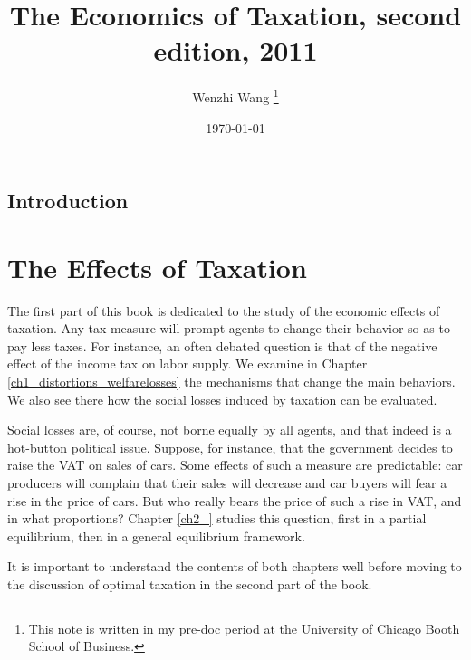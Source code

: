 \documentclass[12pt]{report}
\newcommand{\CiteReference}{../reference.bib}
\theoremstyle{definition}
\begin{document}
 


\title{\bf The Economics of Taxation, second edition, 2011} 
\author{Wenzhi Wang \thanks{This note is written in my pre-doc period at the University of Chicago Booth School of Business.} } 
\date{\today} 
\maketitle 

\tableofcontents

\chapter*{Introduction}

\part{The Effects of Taxation}

The first part of this book is dedicated to the study of the economic effects of taxation. Any tax measure will prompt agents to change their behavior so as to pay less taxes. For instance, an often debated question is that of the negative effect of the income tax on labor supply. We examine in Chapter \ref{ch1_distortions_welfarelosses} the mechanisms that change the main behaviors. We also see there how the social losses induced by taxation can be evaluated.

Social losses are, of course, not borne equally by all agents, and that indeed is a hot-button political issue. Suppose, for instance, that the government decides to raise the VAT on sales of cars. Some effects of such a measure are predictable: car producers will complain that their sales will decrease and car buyers will fear a rise in the price of cars. But who really bears the price of such a rise in VAT, and in what proportions? Chapter \ref{ch2_} studies this question, first in a partial equilibrium, then in a general equilibrium framework.

It is important to understand the contents of both chapters well before moving to the discussion of optimal taxation in the second part of the book.




















%  
\end{document}
